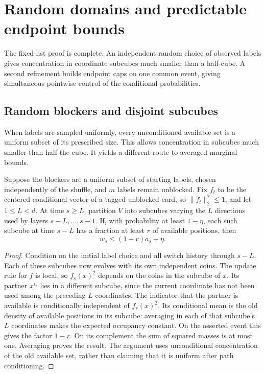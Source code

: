 \section{Random domains and predictable endpoint bounds}\label{sec:noise-extensions}

The fixed-list proof is complete. An independent random choice of observed
labels gives concentration in coordinate subcubes much smaller than a
half-cube. A second refinement builds endpoint caps on one common event,
giving simultaneous pointwise control of the conditional probabilities.

\subsection{Random blockers and disjoint subcubes}

When labels are sampled uniformly, every unconditioned available set is a
uniform subset of its prescribed size. This allows concentration in
subcubes much smaller than half the cube. It yields a different route
to averaged marginal bounds.

\begin{lemma}
\label{noise:subcubes}
Suppose the blockers are a uniform subset of starting labels, chosen
independently of the shuffle, and $m$ labels remain unblocked. Fix
$f_t$ to be the centered conditional vector of a tagged unblocked card,
so $\|f_t\|_2^2\le1$, and let $1\le L<d$.
At time $s\ge L$, partition $V$ into subcubes varying the
$L$ directions used by layers $s-L,\ldots,s-1$. If, with probability
at least $1-\eta$, each such subcube at time $s-L$ has a fraction
at least $r$ of available positions, then
\[
 w_s\le(1-r)a_s+\eta.
\]
\end{lemma}

\begin{proof}
Condition on the initial label choice and all switch history through
$s-L$. Each of these subcubes now evolves with its own independent
coins. The update rule for $f$ is local, so $f_s(x)^2$ depends on the
coins in the subcube of $x$. Its partner $x^{i_s}$ lies in a different
subcube, since the current coordinate has not been used among the
preceding $L$ coordinates. The indicator that the partner is available is conditionally
independent of $f_s(x)^2$. Its conditional mean is the old density of
available positions in its subcube: averaging in each of that subcube's $L$ coordinates
makes the expected occupancy constant. On the asserted event this
gives the factor $1-r$. On its complement the sum of squared masses
is at most one. Averaging proves the result. The argument uses
unconditional concentration of the old available set, rather than claiming
that it is uniform after path conditioning.
\end{proof}

